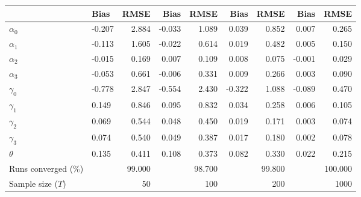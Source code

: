 
\begin{tabular}[t]{llrrrrrrr}
\toprule
  & Bias & RMSE & Bias & RMSE & Bias & RMSE & Bias & RMSE\\
\midrule
$\alpha_{0}$ & -0.207 & 2.884 & -0.033 & 1.089 & 0.039 & 0.852 & 0.007 & 0.265\\
$\alpha_{1}$ & -0.113 & 1.605 & -0.022 & 0.614 & 0.019 & 0.482 & 0.005 & 0.150\\
$\alpha_{2}$ & -0.015 & 0.169 & 0.007 & 0.109 & 0.008 & 0.075 & -0.001 & 0.029\\
$\alpha_{3}$ & -0.053 & 0.661 & -0.006 & 0.331 & 0.009 & 0.266 & 0.003 & 0.090\\
$\gamma_{0}$ & -0.778 & 2.847 & -0.554 & 2.430 & -0.322 & 1.088 & -0.089 & 0.470\\
$\gamma_{1}$ & 0.149 & 0.846 & 0.095 & 0.832 & 0.034 & 0.258 & 0.006 & 0.105\\
$\gamma_{2}$ & 0.069 & 0.544 & 0.048 & 0.450 & 0.019 & 0.171 & 0.003 & 0.074\\
$\gamma_{3}$ & 0.074 & 0.540 & 0.049 & 0.387 & 0.017 & 0.180 & 0.002 & 0.078\\
$\theta$ & 0.135 & 0.411 & 0.108 & 0.373 & 0.082 & 0.330 & 0.022 & 0.215\\
Runs converged (\%) &  & 99.000 &  & 98.700 &  & 99.800 &  & 100.000\\
Sample size ($T$) &  & 50 &  & 100 &  & 200 &  & 1000\\
\bottomrule
\end{tabular}
